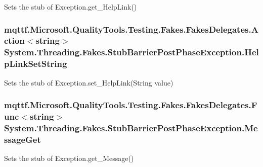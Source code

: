 Sets the stub of Exception.\-get\-\_\-\-Help\-Link()

\hypertarget{class_system_1_1_threading_1_1_fakes_1_1_stub_barrier_post_phase_exception_a5c7fe8bb80f72b4dc55ab84123eeb1d1}{
\subsubsection[{Help\-Link\-Set\-String}]{\setlength{\rightskip}{0pt plus 5cm}mqttf.\-Microsoft.\-Quality\-Tools.\-Testing.\-Fakes.\-Fakes\-Delegates.\-Action$<$string$>$ System.\-Threading.\-Fakes.\-Stub\-Barrier\-Post\-Phase\-Exception.\-Help\-Link\-Set\-String}}\label{class_system_1_1_threading_1_1_fakes_1_1_stub_barrier_post_phase_exception_a5c7fe8bb80f72b4dc55ab84123eeb1d1}


Sets the stub of Exception.\-set\-\_\-\-Help\-Link(\-String value)

\hypertarget{class_system_1_1_threading_1_1_fakes_1_1_stub_barrier_post_phase_exception_aa8e28729f0f8bf334265af9f676bae03}{
\subsubsection[{Message\-Get}]{\setlength{\rightskip}{0pt plus 5cm}mqttf.\-Microsoft.\-Quality\-Tools.\-Testing.\-Fakes.\-Fakes\-Delegates.\-Func$<$string$>$ System.\-Threading.\-Fakes.\-Stub\-Barrier\-Post\-Phase\-Exception.\-Message\-Get}}\label{class_system_1_1_threading_1_1_fakes_1_1_stub_barrier_post_phase_exception_aa8e28729f0f8bf334265af9f676bae03}


Sets the stub of Exception.\-get\-\_\-\-Message()

